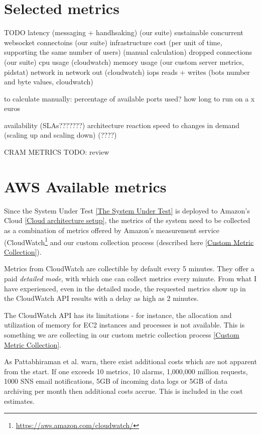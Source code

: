 \documentclass{uvamscse}
\begin{document}
\section{Selected metrics}\label{Selected metrics}
TODO
latency (messaging + handhsaking) (our suite)
sustainable concurrent websocket connectoins (our suite)
infrastructure cost (per unit of time, supporting the same number of users) (manual calculation)
dropped connections (our suite)
cpu usage (cloudwatch)
memory usage (our custom server metrics, pidstat)
network in network out (cloudwatch)
iops reads + writes (bots number and byte values, cloudwatch)

to calculate manually:
percentage of available ports used?
how long to run on a x euros


availability (SLAs???????)
architecture reaction speed to changes in demand (scaling up and scaling down) (????)

CRAM METRICS
TODO: review

\section{AWS Available metrics} \label{AWS Available metrics}

Since the System Under Test \ref{The System Under Test} is deployed to Amazon's Cloud \ref{Cloud architecture setup}, the metrics of the system need to be collected as a combination of metrics offered by Amazon's measurement service (CloudWatch\footnote{\url{https://aws.amazon.com/cloudwatch/}} and our custom collection process (described here \ref{Custom Metric Collection}).

Metrics from CloudWatch are collectible by default every 5 minutes. They offer a paid \textit{detailed mode}, with which one can collect metrics every minute. From what I have experienced, even in the detailed mode, the requested metrics show up in the CloudWatch API results with a delay as high as 2 minutes.

The CloudWatch API has its limitations - for instance, the allocation and utilization of memory for EC2 instances and processes is not available. This is something we are collecting in our custom metric collection process \ref{Custom Metric Collection}.

As Pattabhiraman et al. \cite{Models} warn, there exist additional costs which are not apparent from the start.
If one exceeds 10 metrics, 10 alarms, 1,000,000 million requests, 1000 SNS email notifications, 5GB of incoming data logs or 5GB of data archiving per month then additional costs accrue. This is included in the cost estimates.
\end{document}
